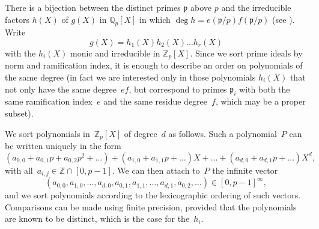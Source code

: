\documentclass{article}
\def\Z{{\mathbb Z}}
\def\Q{{\mathbb Q}}
\def\p{{\mathfrak p}}
\DeclareMathOperator{\disc}{disc}
\begin{document}
There is a bijection between the distinct primes $\p$ above $p$ and
the irreducible factors $h(X)$ of $g(X)$ in $\Q_p[X]$ in which $\deg h
= e(\p/p)f(\p/p)$ (see \cite[Theorem 3.8 (d)]{Janusz}).  Write
\[
  g(X) = h_1(X)h_2(X)\dots h_r(X)
\]
with the $h_i(X)$ monic and irreducible in $\Z_p[X]$. Since we sort
prime ideals by norm and ramification index, it is enough to describe
an order on polynomials of the same degree (in fact we are interested
only in those polynomials $h_i(X)$ that not only have the same
degree~$ef$, but correspond to primes $\p_i$ with both the same
ramification index~$e$ and the same residue degree~$f$, which may be a
proper subset).

We sort polynomials in~$\Z_p[X]$ of degree~$d$ as follows. Such a polynomial~$P$
can be written uniquely in the form
\[
  (a_{0,0}+a_{0,1}p+a_{0,2}p^2+\dots) + (a_{1,0}+a_{1,1}p+\dots)X
  + \dots + (a_{d,0}+a_{d,1}p+\dots)X^d,
\]
with all~$a_{i,j}\in\Z\cap[0,p-1]$. We can then attach to~$P$ the infinite
vector
\[
(a_{0,0},a_{1,0},\dots,a_{d,0},a_{0,1},a_{1,1},\dots,a_{d,1},a_{0,2},\dots)\in [0,p-1]^\infty,
\]
and we sort polynomials according to the lexicographic ordering of such vectors.
Comparisons can be made using finite precision, provided that the polynomials are known to be
distinct, which is the case for the~$h_i$.

\end{document}
